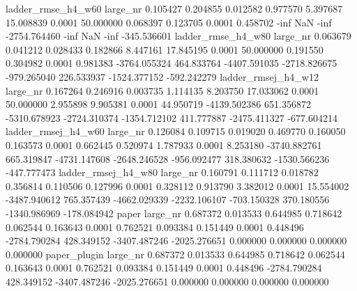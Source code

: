  ladder_rmse_h4_w60   large_nr     0.105427    0.204855    0.012582    0.977570    5.397687  15.008839     0.0001  50.000000  0.068397  0.123705   0.0001  0.458702          -inf          NaN         -inf -2754.764460              -inf              NaN             -inf      -345.536601
 ladder_rmse_h4_w80   large_nr     0.063679    0.041212    0.028433    0.182866    8.447161  17.845195     0.0001  50.000000  0.191550  0.304982   0.0001  0.981383  -3764.055324   464.833764 -4407.591035 -2718.826675       -979.265040       226.533937     -1524.377152      -592.242279
ladder_rmsej_h4_w12   large_nr     0.167264    0.246916    0.003735    1.114135    8.203750  17.033062     0.0001  50.000000  2.955898  9.905381   0.0001 44.950719  -4139.502386   651.356872 -5310.678923 -2724.310374      -1354.712102       411.777887     -2475.411327      -677.604214
ladder_rmsej_h4_w60   large_nr     0.126084    0.109715    0.019020    0.469770    0.160050   0.163573     0.0001   0.662445  0.520974  1.787933   0.0001  8.253180  -3740.882761   665.319847 -4731.147608 -2648.246528       -956.092477       318.380632     -1530.566236      -447.777473
ladder_rmsej_h4_w80   large_nr     0.160791    0.111712    0.018782    0.356814    0.110506   0.127996     0.0001   0.328112  0.913790  3.382012   0.0001 15.554002  -3487.940612   765.357439 -4662.029339 -2232.106107       -703.150328       370.180556     -1340.986969      -178.084942
              paper   large_nr     0.687372    0.013533    0.644985    0.718642    0.062544   0.163643     0.0001   0.762521  0.093384  0.151449   0.0001  0.448496  -2784.790284   428.349152 -3407.487246 -2025.276651          0.000000         0.000000         0.000000         0.000000
       paper_plugin   large_nr     0.687372    0.013533    0.644985    0.718642    0.062544   0.163643     0.0001   0.762521  0.093384  0.151449   0.0001  0.448496  -2784.790284   428.349152 -3407.487246 -2025.276651          0.000000         0.000000         0.000000         0.000000
